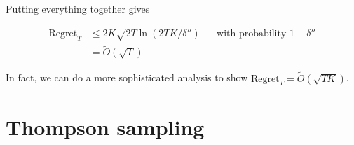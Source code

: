 \documentclass[../main/main]{subfiles}
\begin{document}
Putting everything together gives

\begin{align*}
    \text{Regret}_T &\le 2 K \sqrt{2T \ln(2TK/\delta'')} && \text{with probability } 1-\delta'' \\
    &= \tilde O(\sqrt{T})
\end{align*}


In fact, we can do a more sophisticated analysis to show $\text{Regret}_T = \tilde O(\sqrt{TK})$. 


\section{Thompson sampling}
\end{document}
